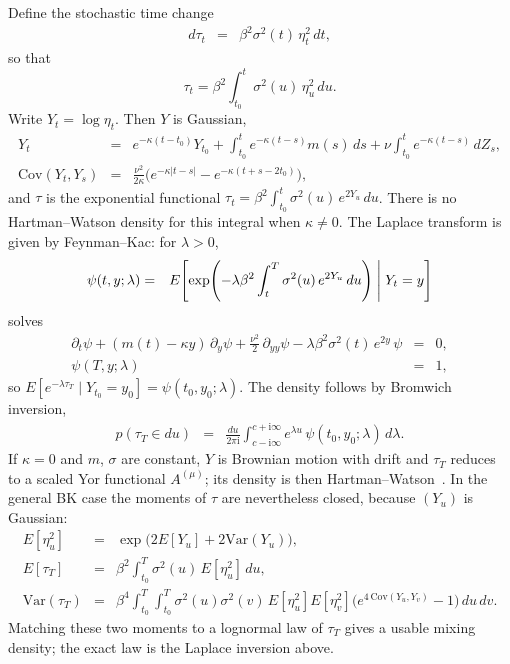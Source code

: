 \documentclass[12pt,a4paper,final]{article}
\theoremstyle{plain}
\begin{document}
Define the stochastic time change
\begin{eqnarray*}
d\tau_t &=& \beta^2 \sigma^2(t)\,\eta_t^{2}\,dt,
\end{eqnarray*}
so that
\begin{equation}
\tau_t = \beta^2 \int_{t_0}^{t} \sigma^2(u)\,\eta_u^{2}\,du.
\end{equation}
Write $Y_t=\log\eta_t$. Then $Y$ is Gaussian,
\begin{eqnarray*}
Y_t
&=&
e^{-\kappa(t-t_0)}Y_{t_0}
+\int_{t_0}^{t}e^{-\kappa(t-s)}m(s)\,ds
+\nu\int_{t_0}^{t}e^{-\kappa(t-s)}\,dZ_s,\\
\mathrm{Cov}(Y_t,Y_s)
&=&
\frac{\nu^{2}}{2\kappa}
\Biggl(
e^{-\kappa\lvert t-s\rvert}
-e^{-\kappa(t+s-2t_0)}
\Biggr),
\end{eqnarray*}
and $\tau$ is the exponential functional
\(\tau_t=\beta^{2}\int_{t_0}^{t}\sigma^{2}(u)\,e^{2Y_u}\,du\).
There is no Hartman--Watson density for this integral when $\kappa\neq 0$.
The Laplace transform is given by Feynman--Kac: for $\lambda>0$,
\begin{eqnarray*}
\psi(t,y;\lambda)
&=&
E\Biggl[
\exp\Biggl(
-\lambda\beta^{2}\int_{t}^{T}\sigma^{2}(u)\,e^{2Y_u}\,du
\Biggr)
\Biggm|Y_t=y\Biggr]
\end{eqnarray*}
solves
\begin{eqnarray*}
\partial_t\psi
+(m(t)-\kappa y)\,\partial_y\psi
+\frac{\nu^{2}}{2}\,\partial_{yy}\psi
-\lambda\beta^{2}\sigma^{2}(t)\,e^{2y}\,\psi
&=&0,\\
\psi(T,y;\lambda)&=&1,
\end{eqnarray*}
so $E[e^{-\lambda\tau_T}\mid Y_{t_0}=y_0]=\psi(t_0,y_0;\lambda)$. The density
follows by Bromwich inversion,
\begin{eqnarray*}
p(\tau_T\in du)
&=&
\frac{du}{2\pi\mathrm{i}}
\int_{c-\mathrm{i}\infty}^{c+\mathrm{i}\infty}
e^{\lambda u}\,\psi(t_0,y_0;\lambda)\,d\lambda.
\end{eqnarray*}
If $\kappa=0$ and $m$, $\sigma$ are constant, $Y$ is Brownian motion with
drift and $\tau_T$ reduces to a scaled Yor functional $A^{(\mu)}$; its
density is then Hartman--Watson~\cite{YOR}. In the general BK case the
moments of $\tau$ are nevertheless closed, because $(Y_u)$ is Gaussian:
\begin{eqnarray*}
E[\eta_u^{2}]
&=&
\exp\bigl(2E[Y_u]+2\mathrm{Var}(Y_u)\bigr),\\
E[\tau_T]
&=&
\beta^{2}\int_{t_0}^{T}\sigma^{2}(u)\,E[\eta_u^{2}]\,du,\\
\mathrm{Var}(\tau_T)
&=&
\beta^{4}
\int_{t_0}^{T}\!\!\int_{t_0}^{T}
\sigma^{2}(u)\sigma^{2}(v)\,
E[\eta_u^{2}]E[\eta_v^{2}]
\bigl(e^{4\,\mathrm{Cov}(Y_u,Y_v)}-1\bigr)\,du\,dv.
\end{eqnarray*}
Matching these two moments to a lognormal law of $\tau_T$ gives a usable
mixing density; the exact law is the Laplace inversion above.
\end{document}
